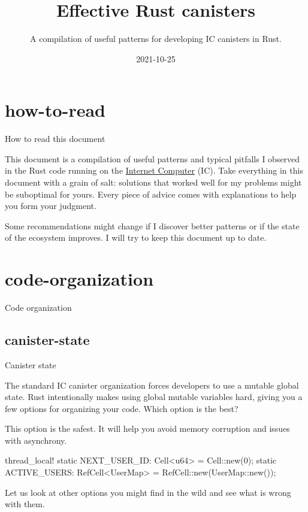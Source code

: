 \documentclass{article}
\title{Effective Rust canisters}
\subtitle{A compilation of useful patterns for developing IC canisters in Rust.}
\date{2021-10-25}
\begin{document}
\section{how-to-read}{How to read this document}

This document is a compilation of useful patterns and typical pitfalls I observed in the Rust code running on the \href{https://internetcomputer.org/}{Internet Computer} (IC).
Take everything in this document with a grain of salt: solutions that worked well for my problems might be suboptimal for yours.
Every piece of advice comes with explanations to help you form your judgment.

Some recommendations might change if I discover better patterns or if the state of the ecosystem improves.
I will try to keep this document up to date.

\section{code-organization}{Code organization}
\subsection{canister-state}{Canister state}

The standard IC canister organization forces developers to use a mutable global state.
Rust intentionally makes using global mutable variables hard, giving you a few options for organizing your code.
Which option is the best?


This option is the safest.
It will help you avoid memory corruption and issues with asynchrony.

\begin{code}[good]
thread_local! {
    static NEXT_USER_ID: Cell<u64> = Cell::new(0);
    static ACTIVE_USERS: RefCell<UserMap> = RefCell::new(UserMap::new());
}
\end{code}

Let us look at other options you might find in the wild and see what is wrong with them.
\end{document}
